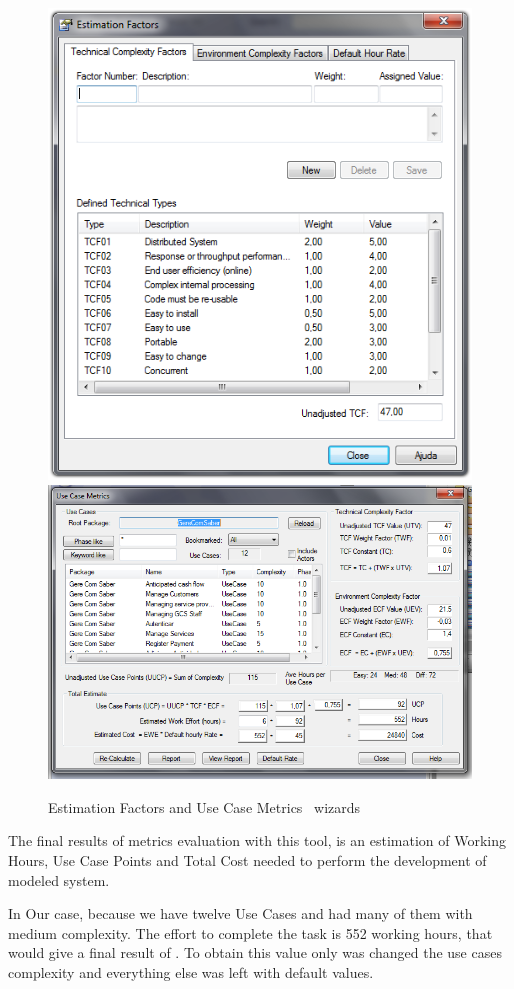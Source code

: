 \begin{figure}[h]
\includegraphics[scale=0.257]{images/sparxestim.png}
\hspace{0.1cm}
\includegraphics[scale=0.29]{images/sparx.png}
\caption{Estimation Factors and Use Case Metrics \entArch\ wizards}\label{img:sparxRes}
\end{figure}

The final results of metrics evaluation with this tool, is an estimation of Working Hours, Use Case Points\cite{Ribu01estimatingobject-oriented} and Total Cost needed to perform the development of modeled system.

In Our case, because we have twelve Use Cases and had many of them with medium complexity. The effort to complete the task is 552 working hours, that would give a final result of . To obtain this value only was changed the use cases complexity and everything else was left with default values.
